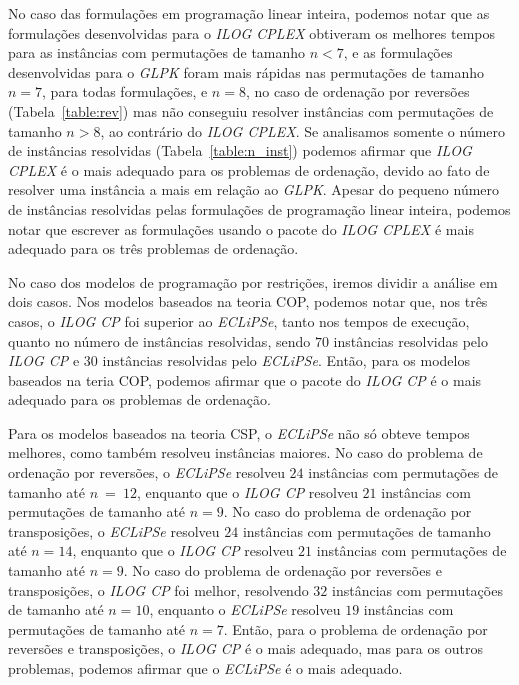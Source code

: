 No caso das formulações em programação linear inteira, podemos notar que
as formulações desenvolvidas para o \textit{ILOG CPLEX} obtiveram os
melhores tempos para as instâncias com permutações de tamanho $n < 7$, e
as formulações desenvolvidas para o \textit{GLPK} foram mais rápidas nas
permutações de tamanho $n = 7$, para todas formulações, e $n = 8$, no
caso de ordenação por reversões (Tabela~\ref{table:rev}) mas não
conseguiu resolver instâncias com permutações de tamanho $n > 8$, ao
contrário do \textit{ILOG CPLEX}.  Se analisamos somente o número de
instâncias resolvidas (Tabela~\ref{table:n_inst}) podemos afirmar
que \textit{ILOG CPLEX} é o mais adequado para os problemas de
ordenação, devido ao fato de resolver uma instância a mais em relação ao
\textit{GLPK}. Apesar do pequeno número de instâncias resolvidas pelas
formulações de programação linear inteira, podemos notar que escrever as
formulações usando o pacote do \textit{ILOG CPLEX} é mais adequado para
os três problemas de ordenação.

No caso dos modelos de programação por restrições, iremos dividir a
análise em dois casos. Nos modelos baseados na teoria COP, podemos notar
que, nos três casos, o \textit{ILOG CP} foi superior ao
\textit{ECLiPSe}, tanto nos tempos de execução, quanto no número de
instâncias resolvidas, sendo $70$ instâncias resolvidas pelo
\textit{ILOG CP} e $30$ instâncias resolvidas pelo \textit{ECLiPSe}.
Então, para os modelos baseados na teria COP, podemos afirmar que o
pacote do \textit{ILOG CP} é o mais adequado para os problemas de
ordenação.

Para os modelos baseados na teoria CSP, o \textit{ECLiPSe} não só
obteve tempos melhores, como também resolveu instâncias maiores. No caso
do problema de ordenação por reversões, o \textit{ECLiPSe} resolveu $24$
instâncias com permutações de tamanho até $n~=~12$, enquanto que o
\textit{ILOG CP} resolveu $21$ instâncias com permutações de tamanho até
$n = 9$. No caso do problema de ordenação por transposições, o
\textit{ECLiPSe} resolveu $24$ instâncias com permutações de tamanho até
$n = 14$, enquanto que o \textit{ILOG CP} resolveu $21$ instâncias com
permutações de tamanho até $n = 9$. No caso do problema de ordenação
por reversões e transposições, o \textit{ILOG CP} foi melhor, resolvendo
$32$ instâncias com permutações de tamanho até $n = 10$, enquanto o
\textit{ECLiPSe} resolveu $19$ instâncias com permutações de tamanho até
$n = 7$.  Então, para o problema de ordenação por reversões e
transposições, o \textit{ILOG CP} é o mais adequado, mas para os outros
problemas, podemos afirmar que o \textit{ECLiPSe} é o mais adequado.

